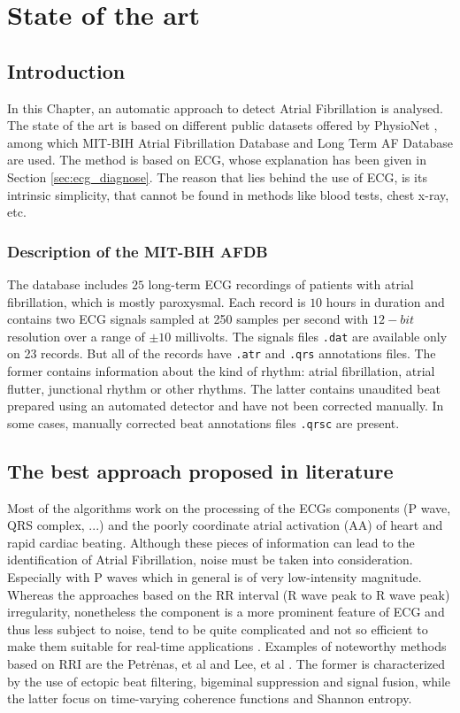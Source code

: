 \chapter{State of the art}
\label{sec:state_of_the_art}

\section{Introduction}
\label{sec:soa_introduction}
In this Chapter, an automatic approach to detect Atrial Fibrillation is analysed. The state of the art is based on different public datasets offered by PhysioNet \cite{physionet}, among which MIT-BIH Atrial Fibrillation Database \cite{afdb} and Long Term AF Database \cite{ltafdb} are used.
The method is based on ECG, whose explanation has been given in Section \ref{sec:ecg_diagnose}. The reason that lies behind the use of ECG, is its intrinsic simplicity, that cannot be found in methods like blood tests, chest x-ray, etc.

\subsection{Description of the MIT-BIH AFDB}
The database includes $25$ long-term ECG recordings of patients with atrial fibrillation, which is mostly paroxysmal. Each record is $10$ hours in duration and contains two ECG signals sampled at 250 samples per second with $12-bit$ resolution over a range of $\pm 10$ millivolts. The signals files \verb|.dat| are available only on 23 records. But all of the records have \verb|.atr| and \verb|.qrs| annotations files. The former contains information about the kind of rhythm: atrial fibrillation, atrial flutter, junctional rhythm or other rhythms. The latter contains unaudited beat prepared using an automated detector and have not been corrected manually. In some cases, manually corrected beat annotations files \verb|.qrsc| are present.

\section{The best approach proposed in literature}
Most of the algorithms work on the processing of the ECGs components (P wave, QRS complex, ...) and the poorly coordinate atrial activation (AA) of heart and rapid cardiac beating. Although these pieces of information can lead to the identification of Atrial Fibrillation, noise must be taken into consideration. Especially with P waves which in general is of very low-intensity magnitude. Whereas the approaches based on the RR interval (R wave peak to R wave peak) irregularity, nonetheless the component is a more prominent feature of ECG and thus less subject to noise, tend to be quite complicated and not so efficient to make them suitable for real-time applications \cite[p. 2]{zhou2015}. Examples of noteworthy methods based on RRI are the Petrėnas, et al \cite[2015]{petrenas2015} and Lee, et al \cite[2013]{lee2013}. The former is characterized by the use of ectopic beat filtering, bigeminal suppression and signal fusion, while the latter focus on time-varying coherence functions and Shannon entropy.

